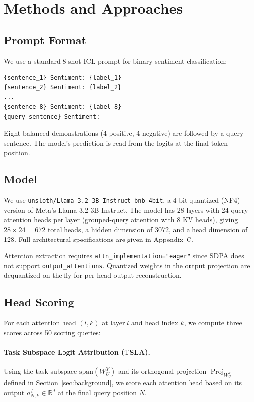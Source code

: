 \documentclass[twoside,english]{article}
\begin{document}
\section{Methods and Approaches} \label{sec:methods}

\subsection{Prompt Format}

We use a standard 8-shot ICL prompt for binary sentiment classification:

\begin{verbatim}
{sentence_1} Sentiment: {label_1}
{sentence_2} Sentiment: {label_2}
...
{sentence_8} Sentiment: {label_8}
{query_sentence} Sentiment:
\end{verbatim}

Eight balanced demonstrations (4 positive, 4 negative) are followed by a query sentence. The model's prediction is read from the logits at the final token position.

\subsection{Model}

We use \texttt{unsloth/Llama-3.2-3B-Instruct-bnb-4bit}, a 4-bit quantized (NF4) version of Meta's Llama-3.2-3B-Instruct. The model has 28 layers with 24 query attention heads per layer (grouped-query attention with 8 KV heads), giving $28 \times 24 = 672$ total heads, a hidden dimension of 3072, and a head dimension of 128. Full architectural specifications are given in Appendix~C.

Attention extraction requires \texttt{attn\_implementation="eager"} since SDPA does not support \texttt{output\_attentions}. Quantized weights in the output projection are dequantized on-the-fly for per-head output reconstruction.

\subsection{Head Scoring}

For each attention head $(l, k)$ at layer $l$ and head index $k$, we compute three scores across 50 scoring queries:

\paragraph{Task Subspace Logit Attribution (TSLA).}
Using the task subspace $\mathrm{span}(W_U^Y)$ and its orthogonal projection $\operatorname{Proj}_{W_U^Y}$ defined in Section~\ref{sec:background}, we score each attention head based on its output $a_{N,k}^{\,l} \in \mathbb{R}^{d}$ at the final query position $N$.
\end{document}
